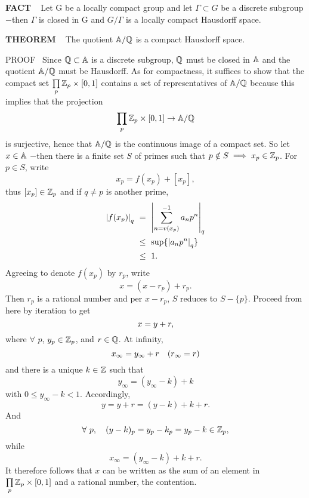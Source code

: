 \vspace{0.1cm}


\begin{x}{\small\bf FACT} \ %
Let G be a locally compact group and let $\Gamma \subset G$ be a discrete 
subgroup $-$then $\Gamma$ is closed in G and $G/\Gamma$ is a locally compact Hausdorff space.
\end{x}




\begin{x}{\small\bf THEOREM} \ %
The quotient $\mathbb{A}/\mathbb{Q}$ is a compact Hausdorff space.

\vspace{0.01cm}

PROOF \  
Since $\mathbb{Q} \subset \mathbb{A}$ is a discrete subgroup, $\mathbb{Q}$ must be closed in $\mathbb{A}$ and the quotient  $\mathbb{A}/\mathbb{Q}$ must be Hausdorff.  
As for compactness, it suffices to show that the compact set $\prod\limits_p \mathbb{Z}_p \times [0,1]$ contains a set of representatives of  
$\mathbb{A}/\mathbb{Q}$ because this implies that the projection
\[
\prod\limits_p \mathbb{Z}_p \times [0,1] \rightarrow \mathbb{A}/\mathbb{Q}
\]
is surjective, hence that  $\mathbb{A}/\mathbb{Q}$ is the continuous image of a compact set.  
So let $x \in \mathbb{A}$ $-$then there is a finite set $S$ of primes such that $p \notin S \implies x_p \in \mathbb{Z}_p$.  
For $p \in S$, write
\[
x_p = f(x_p) + [x_p], 
\]
thus $[x_p] \in \mathbb{Z}_p$ and if $q \ne p$ is another prime,
\begin{align*}
\abs{f(x_p)}_q \ 
&=\  \abs{\sum_{n = v(x_p)}^{-1} a_n p^n}_q \\
&\le\  \sup\{\abs{a_np^n}_q\} \\
&\le\  1.
\end{align*}
Agreeing to denote $f(x_p)$ by  $r_p$, write
\[
x = (x - r_p) + r_p. 
\]
Then $r_p$ is a rational number and per $x - r_p$, $S$ reduces to $S - \{p\}$.  
Proceed from here by iteration to get 
\[
\allowdisplaybreaks
x = y + r, 
\]
where $\forall$ $p$, $y_p \in \mathbb{Z}_p$, and $r \in \mathbb{Q}$.
At infinity,
\[
\allowdisplaybreaks
x_\infty = y_\infty + r \quad (r_\infty = r)
\]
and there is a unique $k \in \mathbb{Z}$ such that
\[
y_\infty = (y_\infty - k) + k 
\]
with $ 0 \le y_\infty - k < 1$.  
Accordingly,
\[
y = y + r = (y - k) + k + r.
\]
And
\[
\forall \ p, \quad (y - k)_p = y_p - k_p = y_p - k \in \mathbb{Z}_p, 
\]
while
\[
x_\infty = (y_\infty - k) + k + r.
\]
It therefore follows that $x$ can be written as the sum of an element in $\prod\limits_p \mathbb{Z}_p \times [0,1]$ and a rational number, the contention.
\end{x}

